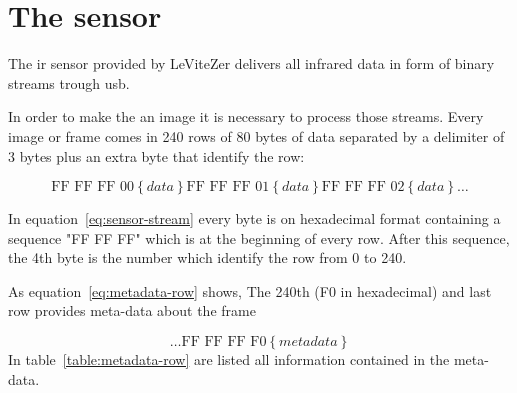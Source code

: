 \documentclass[hidelinks,11pt,a4paper,oneside,article]{memoir}
\begin{document}
\section{The sensor}
The \gls{ir} sensor provided by LeViteZer delivers all infrared data in form of binary streams trough \gls{usb}.

 In order to make the an image it is necessary to process those streams. Every image or frame comes in 240 rows of 80 bytes of data separated by a delimiter of 3 bytes plus an extra byte that identify the row:

\begin{equation}
\label{eq:sensor-stream}
\text {FF FF FF 00} \left\lbrace data \right\rbrace 
\text {FF FF FF 01} \left\lbrace data \right\rbrace 
\text {FF FF FF 02} \left\lbrace data \right\rbrace \dots
\end{equation}



In equation~\ref{eq:sensor-stream} every byte is on hexadecimal format containing a sequence "FF FF FF" which is at the beginning of every row. After this sequence, the 4th byte is the number which identify the row from 0 to 240.

As equation~\ref{eq:metadata-row} shows, The 240th (F0 in hexadecimal) and last row provides meta-data about the frame

\begin{equation}
\label{eq:metadata-row}
\dots \text {FF FF FF F0} \left\lbrace metadata \right\rbrace
\end{equation}
In table~\ref{table:metadata-row} are listed all information contained in the meta-data.
\end{document}
